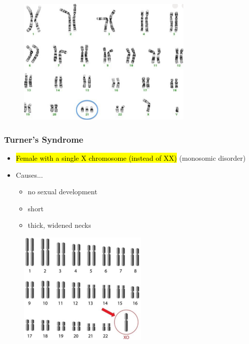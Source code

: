 \documentclass[a4paper,12pt]{article}
\begin{document}
\begin{figure}[H]
    \centering
    \includegraphics[width=0.75\textwidth]{down}
\end{figure}

\pagebreak

\subsubsection{Turner's Syndrome}
\begin{itemize}
    \item{\hl{Female with a single \female X chromosome (instead of \female XX)} (monosomic disorder)}
    \item{
            Causes...
            \begin{itemize}
                \item{no sexual development}
                \item{short}
                \item{thick, widened necks}
            \end{itemize}
        }
\end{itemize}

\begin{figure}[H]
    \centering
    \includegraphics[width=0.55\textwidth]{turners}
\end{figure}
\end{document}
